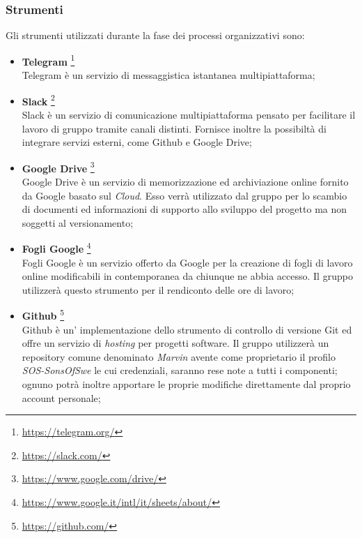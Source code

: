 \subsubsection{Strumenti}
Gli strumenti utilizzati durante la fase dei processi organizzativi sono:
\begin{itemize}
\item \textbf{Telegram}	\footnote{\href{https://telegram.org/}{https://telegram.org/}}
	~\\Telegram è un servizio di messaggistica istantanea multipiattaforma;
	
\item \textbf{Slack} \footnote{\href{https://slack.com/}{https://slack.com/}}
	~\\Slack è un servizio di comunicazione multipiattaforma pensato per facilitare il lavoro di gruppo tramite canali distinti. Fornisce inoltre la possibiltà di integrare servizi esterni, come Github e Google Drive;

\item \textbf{Google Drive} \footnote{\href{https://www.google.com/drive/}{https://www.google.com/drive/}}
	~\\Google Drive è un servizio di memorizzazione ed archiviazione online fornito da Google basato sul \emph{Cloud}. Esso verrà utilizzato dal gruppo per lo scambio di documenti ed informazioni di supporto allo sviluppo del progetto ma non soggetti al versionamento;
	

\item \textbf{Fogli Google}  \footnote{\href{https://www.google.it/intl/it/sheets/about/}{https://www.google.it/intl/it/sheets/about/}}
	~\\Fogli Google è un servizio offerto da Google per la creazione di fogli di lavoro online modificabili in contemporanea da chiunque ne abbia accesso. Il gruppo utilizzerà questo strumento per il rendiconto delle ore di lavoro;
	
\item \textbf{Github}	\footnote{\href{https://github.com/}{https://github.com/}}
	~\\Github è un' implementazione dello strumento di controllo di versione Git ed offre un servizio di \emph{hosting} per progetti software. Il gruppo utilizzerà un repository comune denominato \textit{Marvin} avente come proprietario il profilo \textit{SOS-SonsOfSwe}  le cui credenziali, saranno rese note a tutti i componenti; ognuno potrà inoltre apportare le proprie modifiche direttamente dal proprio account personale;
	

\end{itemize}
